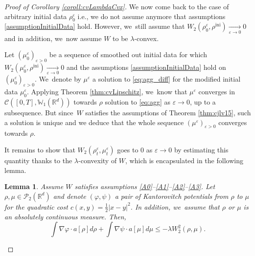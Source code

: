 \documentclass[11pt]{article}
\newcommand{\ie}{i.e.,\xspace}
\numberwithin{equation}{section}
\newcommand{\ini}{\mathrm{ini}}
\def\RR{\mathbb{R}}
\def\WW{\mathbb{W}}
\newcommand{\limi}[2]{\underset{#1 \to #2}{\longrightarrow}}
\def\eps{\varepsilon}
\def\calC{{\mathcal C}}
\def\calP{{\mathcal P}}
\theoremstyle{plain}
\newtheorem{lemma}[theorem]{Lemma}
\theoremstyle{definition}
\begin{document}
\begin{proof}[Proof of Corollary \ref{coroll:cvLambdaCvx}]
We now come back to the case of arbitrary initial data $\rho_0^\eps$ \ie we do not assume anymore that assumptions \eqref{assumptionInitialData} hold. However, we~still assume that $W_2(\rho_0^\eps, \rho^{\ini}) \limi{\eps}{0} 0$ and in addition, we~now assume $W$ to be $\lambda$-convex.

Let $(\mu^\eps_0)_{\eps > 0}$ be a sequence of smoothed out initial data for which $W_2(\mu_0^\eps,\rho^{\ini}) \limi{\eps}{0} 0$ and the assumptions \eqref{assumptionInitialData} hold on $(\mu^\eps_0)_{\eps > 0}$. We~denote by $\mu^\eps$ a solution to \eqref{eq:agg_diff} for the modified initial data $\mu^\eps_0$. Applying Theorem \ref{thm:cvLipschitz}, we~know that $\mu^\eps$ converges in $\calC([0,T], \WW_1(\RR^d))$ towards $\rho$ solution to \eqref{eq:agg} as $\eps \to 0$, up to a subsequence. But since~$W$ satisfies the assumptions of Theorem \ref{thm:cjlv15}, such a solution is unique and we deduce that the whole sequence $(\mu^\eps)_{\eps>0}$ converges towards $\rho$.

It remains to show that $W_2(\rho^\eps_t, \mu^\eps_t)$ goes to 0 as $\eps \to 0$ by estimating this quantity thanks to the $\lambda$-convexity of $W$, which is encapsulated in the following lemma.
\begin{lemma}\label{lemma:contractionLambdaCvx}
Assume $W$ satisfies assumptions \eqref{A0}--\eqref{A1}--\eqref{A2}--\eqref{A3}. Let $\rho, \mu \in \calP_2(\RR^d)$ and denote $(\varphi, \psi)$ a pair of Kantorovitch potentials from $\rho$ to $\mu$ for the quadratic cost $c(x,y) = \frac 12 |x-y|^2$. In addition, we~assume that $\rho$ or $\mu$ is an absolutely continuous measure. Then,
\begin{equation*}%
\int \nabla \varphi \cdot a[\rho] d\rho + \int \nabla \psi \cdot a[\mu] d\mu \leq -\lambda W_2^2(\rho, \mu).
\end{equation*}
\end{lemma}


\end{proof}
\end{document}
